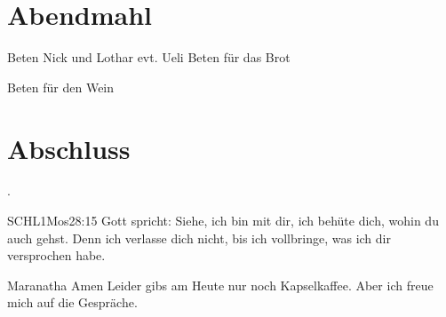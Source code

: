 \documentclass{../../inc/mybib}
\begin{document}

 \section{Abendmahl}
 Beten Nick und Lothar evt. Ueli
 Beten für das Brot 


 Beten für den Wein


\section{Abschluss}

 .

\beten{}

\begin{bibelbox}{SCHL}{1Mos}{28:15}
    Gott spricht: Siehe, ich bin mit dir,
    ich behüte dich, wohin du auch gehst.
    Denn ich verlasse dich nicht,
    bis ich vollbringe, was ich dir versprochen habe.
\end{bibelbox}

Maranatha Amen
Leider gibs am Heute nur noch Kapselkaffee. Aber ich freue mich auf die Gespräche.
\end{document}
